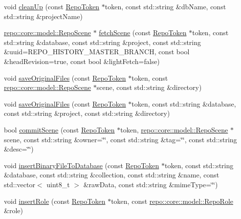 \begin{DoxyCompactItemize}
\item 
void \hyperlink{classrepo_1_1_repo_controller_a47c2114310b012a10a5ec967213cca14}{clean\+Up} (const \hyperlink{class_repo_controller_1_1_repo_token}{Repo\+Token} $\ast$token, const std\+::string \&db\+Name, const std\+::string \&project\+Name)
\item 
\hyperlink{classrepo_1_1core_1_1model_1_1_repo_scene}{repo\+::core\+::model\+::\+Repo\+Scene} $\ast$ \hyperlink{classrepo_1_1_repo_controller_a6b42530f0125c9a1432600c0198310c1}{fetch\+Scene} (const \hyperlink{class_repo_controller_1_1_repo_token}{Repo\+Token} $\ast$token, const std\+::string \&database, const std\+::string \&project, const std\+::string \&uuid=R\+E\+P\+O\+\_\+\+H\+I\+S\+T\+O\+R\+Y\+\_\+\+M\+A\+S\+T\+E\+R\+\_\+\+B\+R\+A\+N\+C\+H, const bool \&head\+Revision=true, const bool \&light\+Fetch=false)
\item 
void \hyperlink{classrepo_1_1_repo_controller_a6f64015d9daf86c65150ec9dad6a2e60}{save\+Original\+Files} (const \hyperlink{class_repo_controller_1_1_repo_token}{Repo\+Token} $\ast$token, const \hyperlink{classrepo_1_1core_1_1model_1_1_repo_scene}{repo\+::core\+::model\+::\+Repo\+Scene} $\ast$scene, const std\+::string \&directory)
\item 
void \hyperlink{classrepo_1_1_repo_controller_a0d02f357f3f94b07947dfc4ed4f80f4c}{save\+Original\+Files} (const \hyperlink{class_repo_controller_1_1_repo_token}{Repo\+Token} $\ast$token, const std\+::string \&database, const std\+::string \&project, const std\+::string \&directory)
\item 
bool \hyperlink{classrepo_1_1_repo_controller_ab745d6dfc21ad9c739f35fcdb934f5ca}{commit\+Scene} (const \hyperlink{class_repo_controller_1_1_repo_token}{Repo\+Token} $\ast$token, \hyperlink{classrepo_1_1core_1_1model_1_1_repo_scene}{repo\+::core\+::model\+::\+Repo\+Scene} $\ast$scene, const std\+::string \&owner=\char`\"{}\char`\"{}, const std\+::string \&tag=\char`\"{}\char`\"{}, const std\+::string \&desc=\char`\"{}\char`\"{})
\item 
void \hyperlink{classrepo_1_1_repo_controller_a0249999d4fff38546717cdd5284932a2}{insert\+Binary\+File\+To\+Database} (const \hyperlink{class_repo_controller_1_1_repo_token}{Repo\+Token} $\ast$token, const std\+::string \&database, const std\+::string \&collection, const std\+::string \&name, const std\+::vector$<$ uint8\+\_\+t $>$ \&raw\+Data, const std\+::string \&mime\+Type=\char`\"{}\char`\"{})
\item 
void \hyperlink{classrepo_1_1_repo_controller_ac9ef30837c88e89e96b2372ad9f5a1c9}{insert\+Role} (const \hyperlink{class_repo_controller_1_1_repo_token}{Repo\+Token} $\ast$token, const \hyperlink{classrepo_1_1core_1_1model_1_1_repo_role}{repo\+::core\+::model\+::\+Repo\+Role} \&role)

\end{DoxyCompactItemize}
